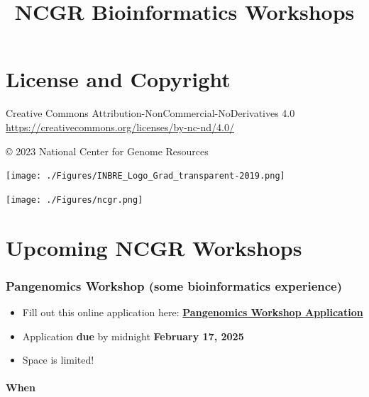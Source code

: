 \documentclass[
]{book}
\title{NCGR Bioinformatics Workshops}
\author{}
\date{\vspace{-2.5em}}
\begin{document}
\maketitle

{
\setcounter{tocdepth}{1}
\tableofcontents
}
\hypertarget{license-and-copyright}{%
\chapter*{License and Copyright}\label{license-and-copyright}}

Creative Commons Attribution-NonCommercial-NoDerivatives 4.0
\url{https://creativecommons.org/licenses/by-nc-nd/4.0/}

© 2023 National Center for Genome Resources

\texttt{[image: ./Figures/INBRE\_Logo\_Grad\_transparent-2019.png]}

\texttt{[image: ./Figures/ncgr.png]}

\hypertarget{upcoming-ncgr-workshops}{%
\chapter*{Upcoming NCGR Workshops}\label{upcoming-ncgr-workshops}}

\hypertarget{pangenomics-workshop-some-bioinformatics-experience}{%
\subsection*{Pangenomics Workshop (some bioinformatics experience)}\label{pangenomics-workshop-some-bioinformatics-experience}}

\begin{itemize}
\item
  Fill out this online application here:
  \href{https://forms.gle/49UbSZFk6AxcGWcH8}{\textbf{Pangenomics Workshop Application}}
\item
  Application \textbf{due} by midnight \textbf{February 17, 2025}
\item
  Space is limited!
\end{itemize}

\hypertarget{when}{%
\subsubsection*{When}\label{when}}
\end{document}

